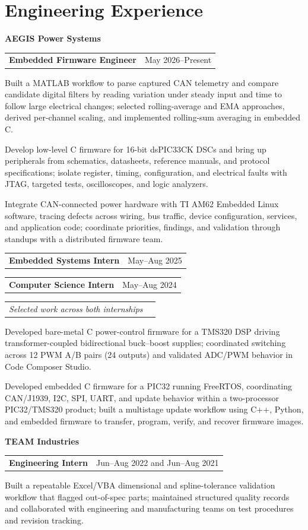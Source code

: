 \documentclass[10pt,letterpaper]{article}
\makeatletter
\newcommand{\companyheader}[1]{%
  {\fontsize{10.4}{10.8}\selectfont\bfseries #1}\par\vspace{-0.03cm}
}
\newcommand{\roleentry}[2]{%
  \begin{tabularx}{\textwidth}{@{}X>{\raggedleft\arraybackslash}p{2.40in}@{}}
    \textbf{#1} & #2
  \end{tabularx}\vspace{-0.075cm}
}
\newcommand{\descriptorentry}[1]{%
  \begin{tabularx}{\textwidth}{@{}X>{\raggedleft\arraybackslash}p{2.40in}@{}}
    \textit{#1} &
  \end{tabularx}\vspace{-0.075cm}
}
\makeatother
\begin{document}
\section{Engineering Experience}
\companyheader{AEGIS Power Systems}
\roleentry{Embedded Firmware Engineer}{May 2026--Present}
\begin{resumebullets}
  \item Built a MATLAB workflow to parse captured CAN telemetry and compare candidate digital filters by reading variation under steady input and time to follow large electrical changes; selected rolling-average and EMA approaches, derived per-channel scaling, and implemented rolling-sum averaging in embedded C.
  \item Develop low-level C firmware for 16-bit dsPIC33CK DSCs and bring up peripherals from schematics, datasheets, reference manuals, and protocol specifications; isolate register, timing, configuration, and electrical faults with JTAG, targeted tests, oscilloscopes, and logic analyzers.
  \item Integrate CAN-connected power hardware with TI AM62 Embedded Linux software, tracing defects across wiring, bus traffic, device configuration, services, and application code; coordinate priorities, findings, and validation through standups with a distributed firmware team.
\end{resumebullets}

\roleentry{Embedded Systems Intern}{May--Aug 2025}
\roleentry{Computer Science Intern}{May--Aug 2024}
\descriptorentry{Selected work across both internships}
\begin{resumebullets}
  \item Developed bare-metal C power-control firmware for a TMS320 DSP driving transformer-coupled bidirectional buck--boost supplies; coordinated switching across 12 PWM A/B pairs (24 outputs) and validated ADC/PWM behavior in Code Composer Studio.
  \item Developed embedded C firmware for a PIC32 running FreeRTOS, coordinating CAN/J1939, I2C, SPI, UART, and update behavior within a two-processor PIC32/TMS320 product; built a multistage update workflow using C++, Python, and embedded firmware to transfer, program, verify, and recover firmware images.
\end{resumebullets}

\companyheader{TEAM Industries}
\roleentry{Engineering Intern}{Jun--Aug 2022 and Jun--Aug 2021}
\begin{resumebullets}
  \item Built a repeatable Excel/VBA dimensional and spline-tolerance validation workflow that flagged out-of-spec parts; maintained structured quality records and collaborated with engineering and manufacturing teams on test procedures and revision tracking.
\end{resumebullets}
\end{document}
